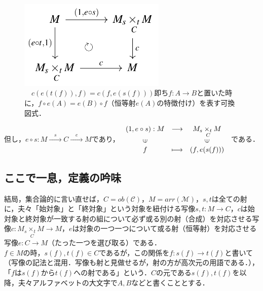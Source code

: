 \documentclass[uplatex, 12pt, a4paper, dvipdfmx]{jsarticle}
\begin{document}
\begin{figure}[ht] \begin{center}  \caption{\label{def-cd:4}　$c(e(t(f)),f)=c(f,e(s(f)))$即ち$f:A\longrightarrow B$と置いた時に，$f\circ e(A)=e(B)\circ f$（恒等射$e(A)$の特徴付け）を表す可換図式．}
    \includegraphics[width=7cm]{cd-4.png}
\end{center}\end{figure}
但し，$e\circ s:M\xrightarrow{\quad s\quad}C\xrightarrow{\quad e \quad}M$であり，
$\begin{array}{ccc}
    (1,e\circ s):M & \longrightarrow & M_s \underset{C}{\times_t}M\\
    \rotatebox{90}{$\in$} & & \rotatebox{90}{$\in$}\\
    f & \longmapsto & (f,e(s(f)))
\end{array}$
である．

\subsection{ここで一息，定義の吟味}

結局，集合論的に言い直せば，$C=ob(\mathcal{C})$，$M=arr(\mathcal{M})$，$s,t$は全ての射に，夫々「始対象」と「終対象」という対象を紐付ける写像$s,t:M\longrightarrow C$，$c$は始対象と終対象が一致する射の組について必ず或る別の射（合成）を対応させる写像$c:M_s \underset{C}{\times_t}M \longrightarrow M$，$e$は対象の一つ一つについて或る射（恒等射）を対応させる写像$e:C\longrightarrow M$（たった一つを選び取る）である．\\
$f\in M$の時，$s(f), t(f)\in C$であるが，この関係を$f:s(f)\longrightarrow t(f)$と書いて（写像の記法と混用．写像も射と見做せるが，射の方が高次元の用語である．），「$f$は$s(f)$から$t(f)$への射である」という．$C$の元である$s(f),t(f)$を以降，夫々アルファベットの大文字で$A,B$などと書くこととする．\\
\end{document}
